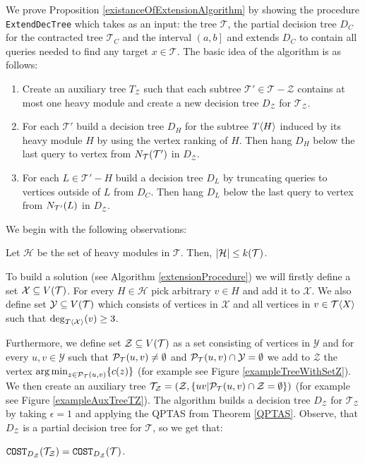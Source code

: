 We prove Proposition \ref{existanceOfExtensionAlgorithm} by showing the procedure \texttt{ExtendDecTree} which takes as an input: the tree $\mathcal{T}$, the partial decision tree $D_C$ for the contracted tree $\mathcal{T}_C$ and the interval $\left(a,b\right]$ and extends $D_C$ to contain all queries needed to find any target $x\in \mathcal{T}$. The basic idea of the algorithm is as follows: 
\begin{enumerate}
    \item Create an auxiliary tree $T_{\mathcal{Z}}$ such that each subtree $\mathcal{T}'\in \mathcal{T}-\mathcal{Z}$ contains at most one heavy module and create a new decision tree $D_{\mathcal{Z}}$ for $\mathcal{T}_{\mathcal{Z}}$.
    \item For each $\mathcal{T}'$ build a decision tree $D_H$ for the subtree $T\mathopen{}\langle H \rangle$ induced by its heavy module $H$ by using the vertex ranking of $H$. Then hang $D_H$ below the last query to vertex from $N_{\mathcal{T}}\mathopen{}\left( \mathcal{T}' \right)$ in $D_{\mathcal{Z}}$.
    \item For each $L\in\mathcal{T}'-H$ build a decision tree $D_L$ by truncating queries to vertices outside of $L$ from $D_C$. Then hang $D_L$ below the last query to vertex from $N_{\mathcal{T'}}\mathopen{}\left( L \right)$ in $D_{\mathcal{Z}}$.
\end{enumerate}

We begin with the following observations:
\begin{observation}
Let $\mathcal{H}$ be the set of heavy modules in $\mathcal{T}$. Then, $\mathopen{}\left| \mathcal{H} \right|\leq k\mathopen{}\left( \mathcal{T} \right)$.
\end{observation}

To build a solution (see Algorithm \ref{extensionProcedure}) we will firstly define a set $\mathcal{X}\subseteq V\mathopen{}\left( \mathcal{T} \right)$. For every $H\in\mathcal{H}$ pick arbitrary $v\in H$ and add it to $\mathcal{X}$. We also define set $\mathcal{Y}\subseteq V\mathopen{}\left( \mathcal{T} \right)$ which consists of vertices in $\mathcal{X}$ and all vertices in $v\in \mathcal{T}\mathopen{}\langle X \rangle$ such that $\deg_{T\mathopen{}\langle \mathcal{X} \rangle}\mathopen{}\left( v \right)\geq 3$. 

Furthermore, we define set $\mathcal{Z}\subseteq V\mathopen{}\left( \mathcal{T} \right)$ as a set consisting of vertices in $\mathcal{Y}$ and for every $u,v\in \mathcal{Y}$ such that $\mathcal{P}_{\mathcal{T}}\mathopen{}\left( u, v \right)\neq\emptyset$ and $\mathcal{P}_{\mathcal{T}}\mathopen{}\left( u, v \right)\cap \mathcal{Y}=\emptyset$ we add to $\mathcal{Z}$ the vertex $\operatorname*{arg\,min}_{z\in \mathcal{P}_{\mathcal{T}}\mathopen{}\left( u, v \right)}\mathopen{}\left\{ c\mathopen{}\left( z \right) \right\}$ (for example see Figure \ref{exampleTreeWithSetZ}). We then create an auxiliary tree $\mathcal{T}_{\mathcal{Z}}=\mathopen{}\left( \mathcal{Z},\mathopen{}\left\{ uv|\mathcal{P}_{\mathcal{T}}\mathopen{}\left( u, v \right)\cap \mathcal{Z}=\emptyset \right\} \right)$ (for example see Figure \ref{exampleAuxTreeTZ}). The algorithm builds a decision tree $D_{\mathcal{Z}}$ for $\mathcal{T}_{\mathcal{Z}}$ by taking $\epsilon=1$ and applying the QPTAS from Theorem \ref{QPTAS}. Observe, that  $D_{\mathcal{Z}}$ is a  partial decision tree for $\mathcal{T}$, so we get that:
\begin{observation}\label{CostDZinTObservation}
    $\texttt{COST}_{D_{\mathcal{Z}}}\mathopen{}\left( \mathcal{T}_{\mathcal{Z}} \right)=\texttt{COST}_{D_{\mathcal{Z}}}\mathopen{}\left( \mathcal{T} \right)$.
\end{observation}

